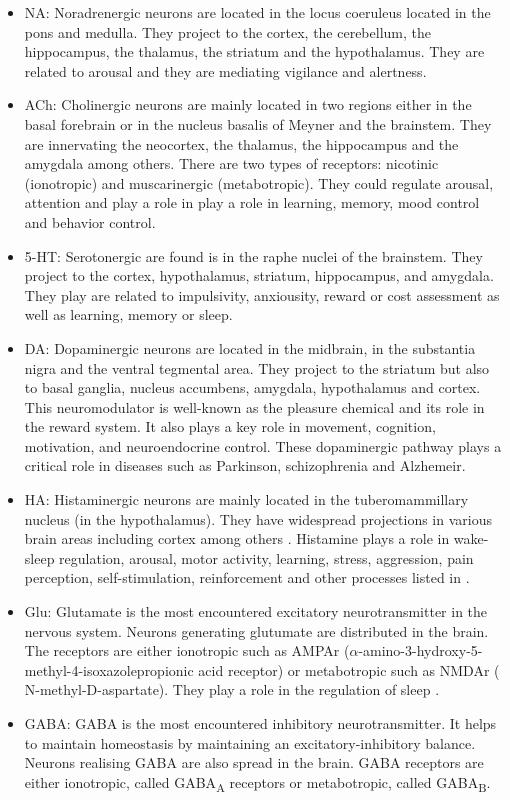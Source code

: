\begin{itemize}
    \item \acrfull{NA}: Noradrenergic neurons are located in the locus coeruleus located in the pons and medulla. They project to the cortex, the cerebellum, the hippocampus, the thalamus, the striatum and the hypothalamus. They are related to arousal and they are mediating vigilance and  alertness.
    \item \acrfull{ACh}: Cholinergic neurons are mainly located in two regions either in the basal forebrain or in the nucleus basalis of Meyner and the brainstem. They are innervating the neocortex,  the thalamus, the hippocampus and the amygdala among others.  There are two types of receptors: nicotinic (ionotropic) and muscarinergic (metabotropic). They could regulate arousal, attention and play a role in play a role in learning,  memory, mood control and behavior control.
    \item \acrfull{5-HT}: Serotonergic are found is in the raphe nuclei of the brainstem. They project to the cortex, hypothalamus, striatum, hippocampus, and amygdala. They play are related to impulsivity, anxiousity, reward or cost assessment as well as learning, memory or sleep. 
    \item \acrfull{DA}: Dopaminergic neurons are located in the midbrain, in the substantia nigra and the ventral tegmental area. They project to the striatum but also to basal ganglia, nucleus accumbens, amygdala, hypothalamus and cortex. This neuromodulator is well-known as the pleasure chemical and its role in the reward system.  It also plays a key role in movement, cognition, motivation, and neuroendocrine control. These dopaminergic pathway plays a critical role in diseases such as Parkinson, schizophrenia and Alzhemeir. 
    \item \acrfull{HA}:  Histaminergic neurons are mainly located in the tuberomammillary nucleus (in the hypothalamus). They have widespread projections in various brain areas including cortex among others \citep{gu_neuromodulatory_2002}. Histamine plays a role in wake-sleep regulation, arousal, motor activity, learning, stress, aggression, pain perception, self-stimulation, reinforcement and other processes listed in \citep{gu_neuromodulatory_2002}.
    \item \acrfull{Glu}: Glutamate is the most encountered excitatory neurotransmitter in the nervous system. Neurons generating glutumate are distributed in the brain. The receptors are either ionotropic such as \acrfull{AMPAr} ($\alpha$-amino-3-hydroxy-5-methyl-4-isoxazolepropionic acid receptor) or metabotropic such as \acrfull{NMDAr} ( N-methyl-D-aspartate). They play a role in the regulation of sleep \citep{watson_sleep_2011}. 
    \item \acrfull{GABA}: GABA is the most encountered inhibitory neurotransmitter. It helps to maintain homeostasis by maintaining an excitatory-inhibitory balance. Neurons realising GABA are also spread in the brain. GABA receptors are either ionotropic, called GABA\textsubscript{A} receptors or metabotropic, called GABA\textsubscript{B}.
\end{itemize}


